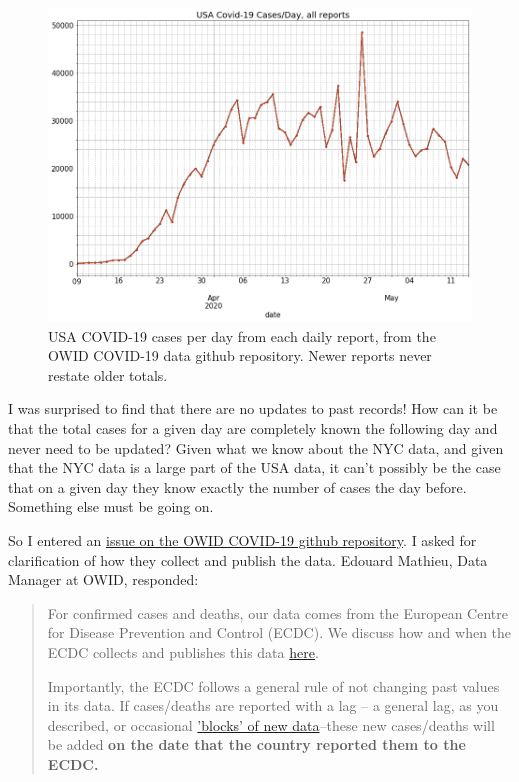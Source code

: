 \documentclass[10pt,reqno]{amsart}
\begin{document}
\begin{figure}[!htb]
  \centering
  \includegraphics[width=\textwidth]{../Notebooks/USACasesPerDayRawNoLegendWave1Peak.png}
  \caption{USA COVID-19 cases per day from each daily report, 
    from the OWID COVID-19 data github repository.  Newer reports
    never restate older totals.}
  \label{fig:owid}
\end{figure}

I was surprised to find that there are no updates to past records!
How can it be that the total cases for a given day are completely
known the following day and never need to be updated?  Given what we
know about the NYC data, and given that the NYC data is a large part
of the USA data, it can't possibly be the case that on a given day
they know exactly the number of cases the day before.  Something else
must be going on.

So I entered an
\href{https://github.com/owid/covid-19-data/issues/41}{issue on the
  OWID COVID-19 github repository}.  I asked for clarification of how
they collect and publish the data.  Edouard Mathieu, Data Manager at
OWID, responded:
\begin{quotation}
  For confirmed cases and deaths, our data comes from the European
  Centre for Disease Prevention and Control (ECDC). We discuss how and
  when the ECDC collects and publishes this data \href{https://ourworldindata.org/coronavirus#our-world-in-data-relies-on-data-from-the-european-cdc}{here}.

  Importantly, the ECDC follows a general rule of not changing past
  values in its data. If cases/deaths are reported with a lag -- a
  general   lag, as you described, or occasional
  \href{https://www.theguardian.com/us-news/2020/apr/15/new-york-city-coronavirus-death-toll-jumps-revised-count}{'blocks'
    of new data}--these new
  cases/deaths will be added \bf{on the date that the country reported them
    to the ECDC.} \cite{Mathieu2020Dates}
\end{quotation}
\end{document}
